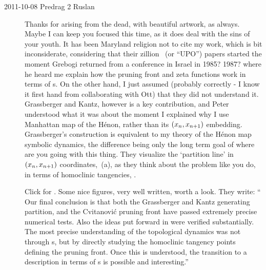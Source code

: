 \begin{description}
\item[2011-10-08 Predrag 2 Ruslan] Thanks for arising from the dead, with
beautiful artwork, as always. Maybe I can keep you focused this time, as
it does deal with the sins of your youth. It has been Maryland religion
not to cite my work, which is bit inconsiderate, considering that their
zillion \po\ (or ``UPO'') papers started the moment Grebogi returned from
a conference in Israel in 1985? 1987? where he heard me explain how the
pruning front and zeta functions work in terms of \po s. On the other
hand, I just assumed (probably correctly - I know it first hand from
collaborating with Ott) that they did not understand it. Grassberger and
Kantz, however is a key contribution, and Peter understood
what it was about the moment I explained why I use Manhattan map of the
H\'enon, rather than its $(x_n,x_{n+1})$ embedding. Grassberger's
construction is equivalent to my theory of the H\'enon map symbolic
dynamics, the difference being only the long term goal of where are you
going with this thing. They visualize the `partition line' in
$(x_n,x_{n+1})$ coordinates, \,(a), as they
think about the problem like you do, in terms of homoclinic tangencies,
.

Click
 for .
Some nice figures, very well written, worth a look.
They write: ``
Our final conclusion is that both the Grassberger and Kantz
generating partition, and the Cvitanovi\'c \etal{} pruning
front have passed extremely precise numerical tests. Also the ideas put
forward in  were verified substantially. The most
precise understanding of the topological dynamics was not through
\po s, but by directly studying the homoclinic tangency points
defining the pruning front. Once this is understood, the transition to a
description in terms of \po s is possible and interesting.''


\end{description}
